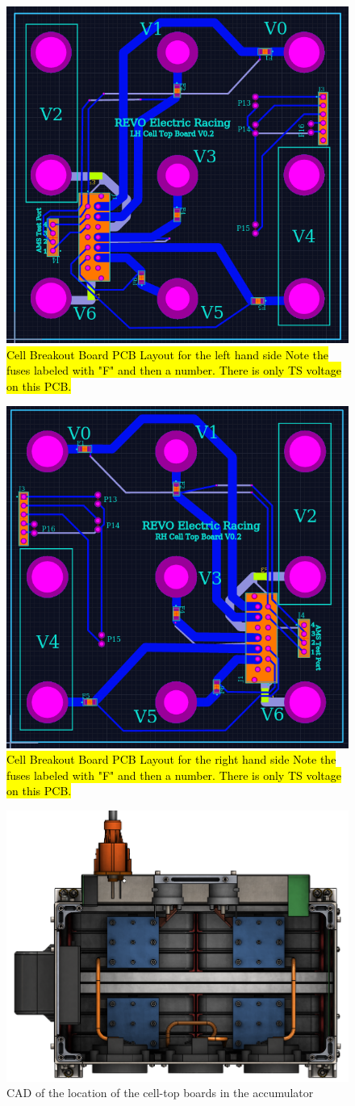 \documentclass{article}
\DeclareRobustCommand{\hlr}[1]{{\sethlcolor{red}\hl{#1}}}
\begin{document}

            \begin{figure}[H]
                \centering
                \includegraphics[width = 0.4 \textwidth]{CellTopLH}
                \caption{\hlr{Cell Breakout Board PCB Layout for the left hand side Note the fuses labeled with "F" and then a number. There is only TS voltage on this PCB.}}
                \label{celltopLH}
            \end{figure}

            \begin{figure}[H]
                \centering
                \includegraphics[width = 0.4 \textwidth]{CellTopRH}
                \caption{\hlr{Cell Breakout Board PCB Layout for the right hand side Note the fuses labeled with "F" and then a number. There is only TS voltage on this PCB.}}
                \label{celltopRH}
            \end{figure}

            \begin{figure}[H]
                \centering
                \includegraphics[width = 0.6 \textwidth]{batterybox_topview}
                \caption{CAD of the location of the cell-top boards in the accumulator}
                \label{accumtopcad}
            \end{figure}
\end{document}
